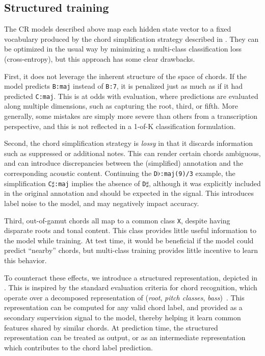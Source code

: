 \documentclass{article}
\begin{document}
\subsection{Structured training}
\label{sec:encoding}

The CR models described above map each hidden state vector to a fixed vocabulary produced by the chord simplification strategy described in .
They can be optimized in the usual way by minimizing a multi-class classification loss (cross-entropy), but this approach has some clear drawbacks.

First, it does not leverage the inherent structure of the space of chords.
If the model predicts \texttt{B:maj} instead of \texttt{B:7}, it is penalized just as much as if it had predicted \texttt{C:maj}.
This is at odds with evaluation, where predictions are evaluated along multiple dimensions, such as capturing the root, third, or fifth.
More generally, some mistakes are simply more severe than others from a transcription perspective, and this is not reflected in a 1-of-K classification formulation.

Second, the chord simplification strategy is \emph{lossy} in that it discards information such as suppressed or additional notes.
This can render certain chords ambiguous, and can introduce discrepancies between the (simplified) annotation and the corresponding acoustic content.
Continuing the \texttt{D}$\flat$\texttt{:maj{(9)}/3} example, the simplification \texttt{C}$\sharp$\texttt{:maj} implies the absence of \texttt{D}$\sharp$, although it was explicitly included in the original annotation and should be expected in the signal.
This introduces label noise to the model, and may negatively impact accuracy.

Third, out-of-gamut chords all map to a common class \texttt{X}, despite having disparate roots and tonal content.
This class provides little useful information to the model while training.
At test time, it would be beneficial if the model could predict ``nearby'' chords, but multi-class training provides little incentive to learn this behavior.


To counteract these effects, we introduce a structured representation, depicted in .
This is inspired by the standard evaluation criteria for chord recognition, which operate over a decomposed representation of (\emph{root}, \emph{pitch classes}, \emph{bass})~\cite{raffel2014mir_eval}.
This representation can be computed for any valid chord label, and provided as a secondary supervision signal to the model, thereby helping it learn common features shared by similar chords.
At prediction time, the structured representation can be treated as output, or as an intermediate representation which contributes to the chord label prediction.
\end{document}
